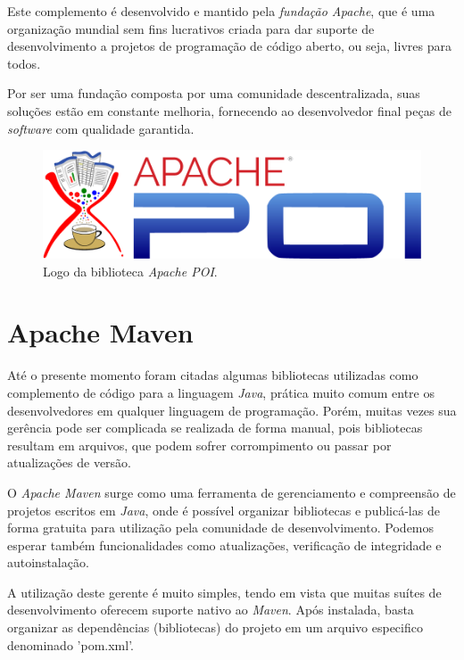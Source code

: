 \documentclass[
	12pt,			%
	openright,		%
	oneside,	
	a4paper,		%
	english,		%
	brazil			%
]{abntex2/abntex2}  %
\begin{document}
	Este complemento é desenvolvido e mantido pela \textit{fundação Apache}, que é uma organização mundial sem fins lucrativos criada para dar suporte de desenvolvimento a projetos de programação de código aberto, ou seja, livres para todos.
	
	Por ser uma fundação composta por uma comunidade descentralizada, suas soluções estão em constante melhoria, fornecendo ao desenvolvedor final peças de \textit{software} com qualidade garantida.

	\begin{figure}[H]
		\caption{\label{apache-poi}Logo da biblioteca \textit{Apache POI}.}
		\begin{center}
			\includegraphics[scale=0.35]{img/apache-poi}
		\end{center}
	\end{figure}

	\section{Apache Maven}
	
	Até o presente momento foram citadas algumas bibliotecas utilizadas como complemento de código para a linguagem \textit{Java}, prática muito comum entre os desenvolvedores em qualquer linguagem de programação. Porém, muitas vezes sua gerência pode ser complicada se realizada de forma manual, pois bibliotecas resultam em arquivos, que podem sofrer corrompimento ou passar por atualizações de versão.
	
	O \textit{Apache Maven} \cite{maven} surge como uma ferramenta de gerenciamento e compreensão de projetos escritos em \textit{Java}, onde é possível organizar bibliotecas e publicá-las de forma gratuita para utilização pela comunidade de desenvolvimento. Podemos esperar também funcionalidades como atualizações, verificação de integridade e autoinstalação.
	
	A utilização deste gerente é muito simples, tendo em vista que muitas suítes de desenvolvimento oferecem suporte nativo ao \textit{Maven}. Após instalada, basta organizar as dependências (bibliotecas) do projeto em um arquivo especifico denominado 'pom.xml'.
\end{document}
